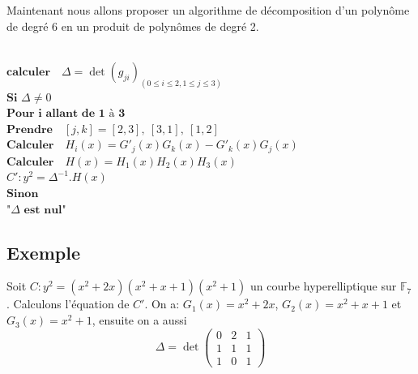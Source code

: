 \documentclass[12pt,a4paper]{article}
\begin{document}
	Maintenant nous allons proposer un algorithme de décomposition d'un polynôme de degré 6 en un produit de polynômes de degré 2. \\\\
	\begin{algorithm}[H] 
		\caption{Decomposition via les formules de Richelot}
		\label{alg:decompostion_richelot}
		
		$\textbf{calculer}\quad \Delta = \det(g_{ji})_{(0\leq i\leq 2 , 1\leq j\leq 3)}$\\
		$\textbf{Si $\Delta \neq 0$}$\\
		\hspace*{1cm}$\textbf{Pour i allant de 1 \`a 3}$\\
		\hspace*{2cm}$\textbf{Prendre} \quad [j,k] = [2,3],\ [3,1],\ [1,2]$\\
		\hspace*{2cm}$\textbf{Calculer} \quad H_i(x) = G'_{j}(x)G_{k}(x) - G'_{k}(x)G_{j}(x)$\\
		\hspace*{1cm}$\textbf{Calculer} \quad H(x) = H_1(x)H_2(x)H_3(x)$\\
		\hspace*{1cm}\Return $C': y^2 = \Delta^{-1} . H(x) $\\
		$\textbf{Sinon}$\\
		\hspace*{1cm}\Return $\textbf{"$\Delta$ est nul"}$
		
	\end{algorithm}
	\subsection{Exemple}
	Soit $C: y^2 = (x^2 + 2x)(x^2 + x + 1)(x^2 + 1)$ un courbe hyperelliptique sur $\mathbb{F}_{7}$. Calculons
	l'équation de $C'$.
	On a: $G_1(x) = x^2 + 2x$, $G_2(x) = x^2 + x + 1$ et $G_3(x) = x^2 + 1$, ensuite on a aussi 
	\[\Delta = \det
		\begin{pmatrix}
			0 & 2 & 1 \\
			1 & 1 & 1 \\
			1 & 0 & 1
	\end{pmatrix}\]
	
\end{document}
